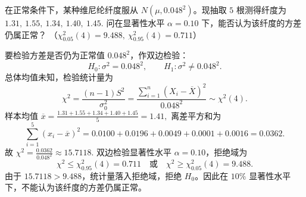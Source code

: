 \documentclass[lang=cn,11pt]{elegantbook}
\begin{document}
\begin{exercise}\label{exer:src-2008-01-3a-iv-05b}\label{exer:src-paper2-app-05b}\label{prob:p2-app-05b}
在正常条件下，某种维尼纶纤度服从 \(N(\mu,0.048^2)\)。现抽取 \(5\) 根测得纤度为
\(
1.31,\ 1.55,\ 1.34,\ 1.40,\ 1.45.
\)
问在显著性水平 \(\alpha=0.10\) 下，能否认为该纤度的方差仍属正常？
（\(\chi^2_{0.05}(4)=9.488,\ \chi^2_{0.95}(4)=0.711\)）
\end{exercise}
\begin{solution}
要检验方差是否仍为正常值 \(0.048^2\)，作双边检验：
\[
H_0\colon \sigma^2=0.048^2,\qquad H_1\colon \sigma^2\neq0.048^2.
\]
总体均值未知，检验统计量为
\[
\chi^2=\frac{(n-1)S^2}{\sigma_0^2}
=\frac{\sum_{i=1}^{n}(X_i-\overline{X})^2}{0.048^2}
\sim \chi^2(4).
\]
样本均值
\(
\overline{x}=\frac{1.31+1.55+1.34+1.40+1.45}{5}=1.41,
\)
离差平方和为
\[
\sum_{i=1}^{5}(x_i-\overline{x})^2
=0.0100+0.0196+0.0049+0.0001+0.0016
=0.0362.
\]
故
\(
\chi^2=\frac{0.0362}{0.048^2}\approx15.7118.
\)
双边检验显著性水平 \(\alpha=0.10\)，拒绝域为
\[
\chi^2\le \chi^2_{0.95}(4)=0.711
\quad\text{或}\quad
\chi^2\ge \chi^2_{0.05}(4)=9.488.
\]
由于 \(15.7118>9.488\)，统计量落入拒绝域，拒绝 \(H_0\)。因此在 \(10\%\) 显著性水平下，不能认为该纤度的方差仍属正常。
\end{solution}
\end{document}
